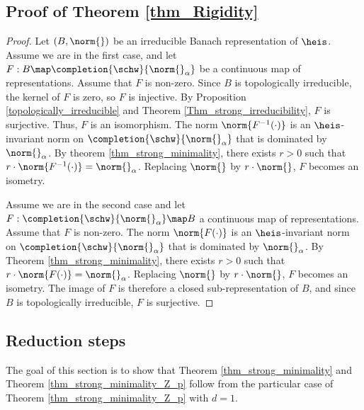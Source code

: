     
\subsection{Proof of Theorem \ref{thm_Rigidity}}

    \begin{proof}
    Let $(B,\norm{})$ be an irreducible Banach representation of $\heis$.
    Assume we are in the first case, and let $F:B\map \completion{\schw}{\norm{}_\alpha}$ be a continuous map of representations.
    Assume that $F$ is non-zero.
    Since $B$ is topologically irreducible, the kernel of $F$ is zero, so $F$ is injective. 
    By Proposition \ref{topologically_irreducible} and Theorem \ref{Thm_strong_irreducibility}, $F$ is surjective.
    Thus, $F$ is an isomorphism.
    The norm $\norm{F^{-1}(\cdot)}$ is an $\heis$-invariant norm on $\completion{\schw}{\norm{}_\alpha}$ that is dominated by $\norm{}_\alpha$.
    By theorem \ref{thm_strong_minimality}, there exists $r>0$ such that $r\cdot \norm{F^{-1}(\cdot)}=\norm{}_\alpha$.
    Replacing $\norm{}$ by $r\cdot\norm{}$, $F$ becomes an isometry.    
        
    Assume we are in the second case and let $F:\completion{\schw}{\norm{}_\alpha}\map B$ a continuous map of representations.
    Assume that $F$ is non-zero.
    The norm $\norm{F(\cdot)}$ is an $\heis$-invariant norm on $\completion{\schw}{\norm{}_\alpha}$ that is dominated by $\norm{}_\alpha$.
    By Theorem \ref{thm_strong_minimality}, there exists $r>0$ such that $r\cdot\norm{F(\cdot)}=\norm{}_\alpha$.
    Replacing $\norm{}$ by $r\cdot \norm{}$, $F$ becomes an isometry.
    The image of $F$ is therefore a closed sub-representation of $B$, and since $B$ is topologically irreducible, $F$ is surjective.
    \end{proof} 

\subsection{Reduction steps}
The goal of this section is to show that Theorem \ref{thm_strong_minimality} and Theorem \ref{thm_strong_minimality_Z_p} follow from the particular case of Theorem \ref{thm_strong_minimality_Z_p} with $d=1$.

